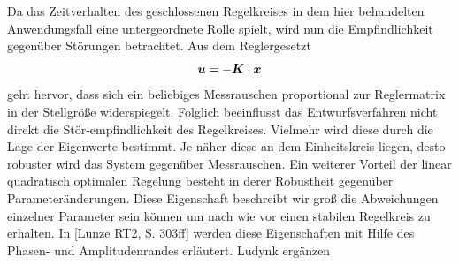 Da das Zeitverhalten des geschlossenen Regelkreises in dem hier behandelten Anwendungsfall eine untergeordnete Rolle spielt, wird nun die Empfindlichkeit gegenüber Störungen betrachtet. Aus dem Reglergesetzt
\begin{equation}
\boldsymbol{u} = -\boldsymbol{K}\cdot\boldsymbol{x}
\end{equation}
geht hervor, dass sich ein beliebiges Messrauschen proportional zur Reglermatrix in der Stellgröße widerspiegelt. Folglich beeinflusst das Entwurfsverfahren nicht direkt die Stör-empfindlichkeit des Regelkreises. Vielmehr wird diese durch die Lage der Eigenwerte bestimmt. Je näher diese an dem Einheitskreis liegen, desto robuster wird das System gegenüber Messrauschen.
Ein weiterer Vorteil der linear quadratisch optimalen Regelung besteht in derer Robustheit gegenüber Parameteränderungen. Diese Eigenschaft beschreibt wir groß die Abweichungen einzelner Parameter sein können um nach wie vor einen stabilen Regelkreis zu erhalten. In [Lunze RT2, S. 303ff] werden diese Eigenschaften mit Hilfe des Phasen- und Amplitudenrandes erläutert. Ludynk ergänzen
